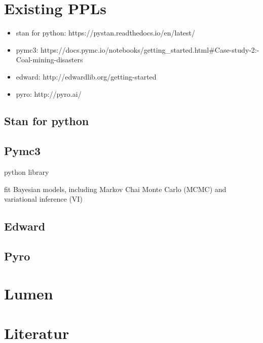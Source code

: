 \documentclass{article}
\begin{document}

\section{Existing PPLs}

\begin{itemize}
     \item stan for python: https://pystan.readthedocs.io/en/latest/
    \item pymc3: https://docs.pymc.io/notebooks/getting\_started.html\#Case-study-2:-Coal-mining-disasters
    \item edward: http://edwardlib.org/getting-started
    \item pyro: http://pyro.ai/
\end{itemize}

\subsection{Stan for python}

\subsection{Pymc3}

python library

fit Bayesian models, including Markov Chai Monte Carlo (MCMC) and variational inference (VI)


\subsection{Edward}

\subsection{Pyro}


\section{Lumen}

\listoffigures
        
\section{Literatur}



\end{document}
